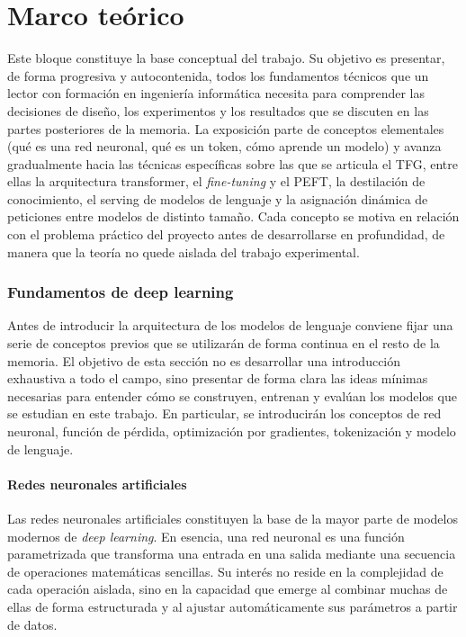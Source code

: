\part{Marco teórico}
\label{part:marco-teorico}

Este bloque constituye la base conceptual del trabajo. Su objetivo es presentar, de forma progresiva y autocontenida, todos los fundamentos técnicos que un lector con formación en ingeniería informática necesita para comprender las decisiones de diseño, los experimentos y los resultados que se discuten en las partes posteriores de la memoria. La exposición parte de conceptos elementales (qué es una red neuronal, qué es un token, cómo aprende un modelo) y avanza gradualmente hacia las técnicas específicas sobre las que se articula el TFG, entre ellas la arquitectura transformer, el \textit{fine-tuning} y el PEFT, la destilación de conocimiento, el serving de modelos de lenguaje y la asignación dinámica de peticiones entre modelos de distinto tamaño. Cada concepto se motiva en relación con el problema práctico del proyecto antes de desarrollarse en profundidad, de manera que la teoría no quede aislada del trabajo experimental.

\section{Fundamentos de deep learning}
\label{sec:fundamentos}

Antes de introducir la arquitectura de los modelos de lenguaje conviene fijar una serie de conceptos previos que se utilizarán de forma continua en el resto de la memoria. El objetivo de esta sección no es desarrollar una introducción exhaustiva a todo el campo, sino presentar de forma clara las ideas mínimas necesarias para entender cómo se construyen, entrenan y evalúan los modelos que se estudian en este trabajo. En particular, se introducirán los conceptos de red neuronal, función de pérdida, optimización por gradientes, tokenización y modelo de lenguaje.

\subsection{Redes neuronales artificiales}

Las redes neuronales artificiales constituyen la base de la mayor parte de modelos modernos de \textit{deep learning}. En esencia, una red neuronal es una función parametrizada que transforma una entrada en una salida mediante una secuencia de operaciones matemáticas sencillas. Su interés no reside en la complejidad de cada operación aislada, sino en la capacidad que emerge al combinar muchas de ellas de forma estructurada y al ajustar automáticamente sus parámetros a partir de datos.

